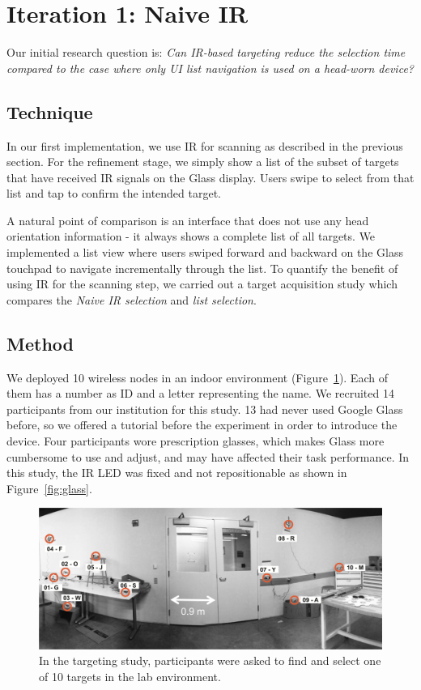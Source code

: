 
\section{Iteration 1: Naive IR}
Our initial research question is: {\em Can IR-based targeting reduce the selection time compared to the case where only UI list navigation is used on a head-worn device?} 

\subsection{Technique}
In our first implementation, we use IR for scanning as described in the previous section. For the refinement stage, we simply show a list of the subset of targets that have received IR signals on the Glass display. Users swipe to select from that list and tap to confirm the intended target.

A natural point of comparison is an interface that does not use any head orientation information - it always shows a complete list of all targets. We implemented a list view where users swiped forward and backward on the Glass touchpad to navigate incrementally through the list. To quantify the benefit of using IR for the scanning step, we carried out a target acquisition study which compares the {\em Naive IR selection} and {\em list selection}.  

\subsection{Method}
We deployed 10 wireless nodes in an indoor environment (Figure~\ref{fig:targeting-study-layout}). Each of them has a number as ID and a letter representing the name. We recruited 14 participants from our institution for this study. 13 had never used Google Glass before, so we offered a tutorial before the experiment in order to introduce the device. Four participants wore prescription glasses, which makes Glass more cumbersome to use and adjust, and may have affected their task performance. In this study, the IR LED was fixed and not repositionable as shown in Figure~\ref{fig:glass}.

\begin{figure}[t]
\centering
\includegraphics[width=1.0\columnwidth]{figures/study-layout1.png}
\caption{In the targeting study, participants were asked to find and select one of 10 targets in the lab environment.}
\label{fig:targeting-study-layout}
\end{figure}

